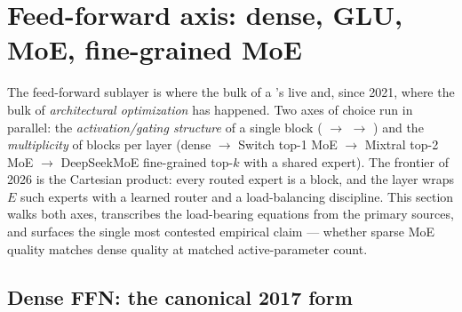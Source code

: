 
\section{Feed-forward axis: dense, GLU, MoE, fine-grained MoE}
\label{sec:ffn}
\label{sec:feedforward-axis}
\label{sec:ffn-axis}

The feed-forward sublayer is where the bulk of a 's
 live and, since 2021, where the bulk of \emph{architectural
optimization} has happened. Two axes of choice run in parallel: the
\emph{activation/gating structure} of a single  block ( $\to$
 $\to$ ) and the \emph{multiplicity} of  blocks per layer
(dense $\to$ Switch top-1 MoE $\to$ Mixtral top-2 MoE $\to$
DeepSeekMoE fine-grained top-$k$ with a shared expert). The frontier
of 2026 is the Cartesian product: every routed expert is a 
block, and the layer wraps $E$ such experts with a learned router and
a load-balancing discipline. This section walks both axes, transcribes
the load-bearing equations from the primary sources, and surfaces the
single most contested empirical claim --- whether sparse MoE quality
matches dense quality at matched active-parameter count.

\subsection{Dense FFN: the canonical 2017 form}
\label{sec:ffn-vaswani}

